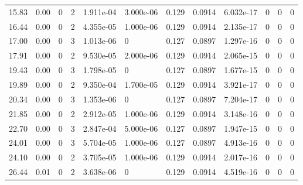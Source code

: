 \documentclass[preview]{standalone}
\begin{document}
{{\begin{tabular}{L{1.2cm}C{1.2cm} C{0.3cm}C{0.5cm} C{1.4cm}C{1.4cm} C{1.4cm}C{1.4cm} C{1.6cm}C{1.6cm} C{1.6cm}C{1.6cm}}
  15.83  &  0.00  & 0     &  2 &  1.911e-04  & 3.000e-06  &  0.129&   0.0914& 6.032e-17 & 0   &  0 & 0  \\ 
  16.44  &  0.00  & 0     &  2 &  4.355e-05  & 1.000e-06  &  0.129&   0.0914& 2.135e-17 & 0   &  0 & 0  \\ 
  17.00  &  0.00  & 0     &  3 &  1.013e-06  & 0  &  0.127&   0.0897& 1.297e-16 & 0   &  0 & 0  \\ 
  17.91  &  0.00  & 0     &  2 &  9.530e-05  & 2.000e-06  &  0.129&   0.0914& 2.065e-15 & 0   &  0 & 0  \\ 
  19.43  &  0.00  & 0     &  3 &  1.798e-05  & 0  &  0.127&   0.0897& 1.677e-15 & 0   &  0 & 0  \\ 
  19.89  &  0.00  & 0     &  2 &  9.350e-04  & 1.700e-05  &  0.129&   0.0914& 3.921e-17 & 0   &  0 & 0  \\ 
  20.34  &  0.00  & 0     &  3 &  1.353e-06  & 0  &  0.127&   0.0897& 7.204e-17 & 0   &  0 & 0  \\ 
  21.85  &  0.00  & 0     &  2 &  2.912e-05  & 1.000e-06  &  0.129&   0.0914& 3.148e-16 & 0   &  0 & 0  \\ 
  22.70  &  0.00  & 0     &  3 &  2.847e-04  & 5.000e-06  &  0.127&   0.0897& 1.947e-15 & 0   &  0 & 0  \\ 
  24.01  &  0.00  & 0     &  3 &  5.704e-05  & 1.000e-06  &  0.127&   0.0897& 4.913e-16 & 0   &  0 & 0  \\ 
  24.10  &  0.00  & 0     &  2 &  3.705e-05  & 1.000e-06  &  0.129&   0.0914& 2.017e-16 & 0   &  0 & 0  \\ 
  26.44  &  0.01  & 0     &  2 &  3.638e-06  & 0  &  0.129&   0.0914& 4.519e-16 & 0   &  0 & 0  \\ 
\hline 
\end{tabular} 

}}
\end{document}
